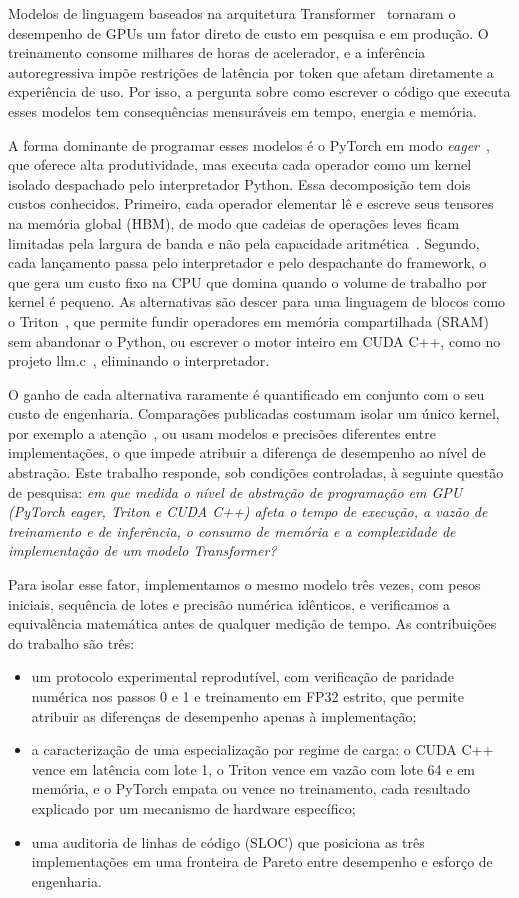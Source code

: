 \documentclass[conference]{IEEEtran}
\begin{document}
Modelos de linguagem baseados na arquitetura Transformer~\cite{vaswani2017attention,radford2019language} tornaram o desempenho de GPUs um fator direto de custo em pesquisa e em produção. O treinamento consome milhares de horas de acelerador, e a inferência autoregressiva impõe restrições de latência por token que afetam diretamente a experiência de uso. Por isso, a pergunta sobre como escrever o código que executa esses modelos tem consequências mensuráveis em tempo, energia e memória.

A forma dominante de programar esses modelos é o PyTorch em modo \textit{eager}~\cite{paszke2019pytorch}, que oferece alta produtividade, mas executa cada operador como um kernel isolado despachado pelo interpretador Python. Essa decomposição tem dois custos conhecidos. Primeiro, cada operador elementar lê e escreve seus tensores na memória global (HBM), de modo que cadeias de operações leves ficam limitadas pela largura de banda e não pela capacidade aritmética~\cite{ivanov2021data}. Segundo, cada lançamento passa pelo interpretador e pelo despachante do framework, o que gera um custo fixo na CPU que domina quando o volume de trabalho por kernel é pequeno. As alternativas são descer para uma linguagem de blocos como o Triton~\cite{tillet2019triton}, que permite fundir operadores em memória compartilhada (SRAM) sem abandonar o Python, ou escrever o motor inteiro em CUDA C++, como no projeto llm.c~\cite{karpathy2024llmc}, eliminando o interpretador.

O ganho de cada alternativa raramente é quantificado em conjunto com o seu custo de engenharia. Comparações publicadas costumam isolar um único kernel, por exemplo a atenção~\cite{dao2022flashattention}, ou usam modelos e precisões diferentes entre implementações, o que impede atribuir a diferença de desempenho ao nível de abstração. Este trabalho responde, sob condições controladas, à seguinte questão de pesquisa: \textit{em que medida o nível de abstração de programação em GPU (PyTorch eager, Triton e CUDA C++) afeta o tempo de execução, a vazão de treinamento e de inferência, o consumo de memória e a complexidade de implementação de um modelo Transformer?}

Para isolar esse fator, implementamos o mesmo modelo três vezes, com pesos iniciais, sequência de lotes e precisão numérica idênticos, e verificamos a equivalência matemática antes de qualquer medição de tempo. As contribuições do trabalho são três:
\begin{itemize}
\item um protocolo experimental reprodutível, com verificação de paridade numérica nos passos 0 e 1 e treinamento em FP32 estrito, que permite atribuir as diferenças de desempenho apenas à implementação;
\item a caracterização de uma especialização por regime de carga: o CUDA C++ vence em latência com lote 1, o Triton vence em vazão com lote 64 e em memória, e o PyTorch empata ou vence no treinamento, cada resultado explicado por um mecanismo de hardware específico;
\item uma auditoria de linhas de código (SLOC) que posiciona as três implementações em uma fronteira de Pareto entre desempenho e esforço de engenharia.
\end{itemize}
\end{document}
